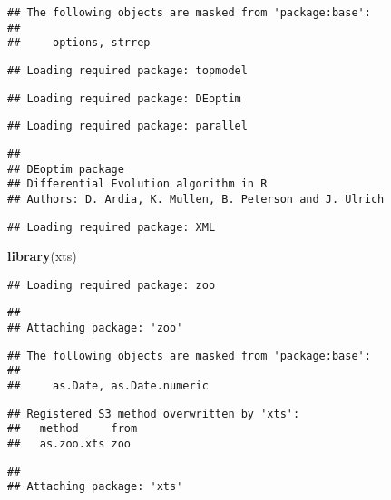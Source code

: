 \documentclass[]{article}
\newenvironment{Shaded}{\begin{snugshade}}{\end{snugshade}}
\newcommand{\KeywordTok}[1]{\textcolor[rgb]{0.13,0.29,0.53}{\textbf{#1}}}
\newcommand{\NormalTok}[1]{#1}
\begin{document}
\begin{verbatim}
## The following objects are masked from 'package:base':
## 
##     options, strrep
\end{verbatim}

\begin{verbatim}
## Loading required package: topmodel
\end{verbatim}

\begin{verbatim}
## Loading required package: DEoptim
\end{verbatim}

\begin{verbatim}
## Loading required package: parallel
\end{verbatim}

\begin{verbatim}
## 
## DEoptim package
## Differential Evolution algorithm in R
## Authors: D. Ardia, K. Mullen, B. Peterson and J. Ulrich
\end{verbatim}

\begin{verbatim}
## Loading required package: XML
\end{verbatim}

\begin{Shaded}
\begin{Highlighting}[]
\KeywordTok{library}\NormalTok{(xts)}
\end{Highlighting}
\end{Shaded}

\begin{verbatim}
## Loading required package: zoo
\end{verbatim}

\begin{verbatim}
## 
## Attaching package: 'zoo'
\end{verbatim}

\begin{verbatim}
## The following objects are masked from 'package:base':
## 
##     as.Date, as.Date.numeric
\end{verbatim}

\begin{verbatim}
## Registered S3 method overwritten by 'xts':
##   method     from
##   as.zoo.xts zoo
\end{verbatim}

\begin{verbatim}
## 
## Attaching package: 'xts'
\end{verbatim}
\end{document}
